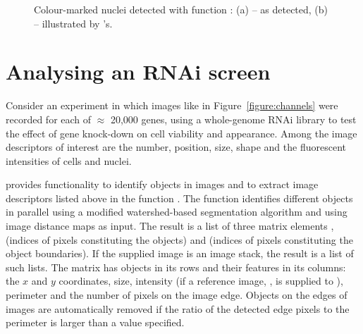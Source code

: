 \begin{figure}
\vspace*{.1in}
\begin{center}
\end{center}
\caption{\label{figure:drawables}
    Colour-marked nuclei detected with function : (a) -- as detected, (b) -- illustrated by 's.
}
\end{figure}

\section*{Analysing an RNAi screen}

Consider an experiment in which images like in Figure~\ref{figure:channels} were recorded for each of $\approx$ 20,000 genes, using a whole-genome RNAi library to test the effect of gene knock-down on cell viability and appearance. Among the image descriptors of interest are the number, position, size, shape and the fluorescent intensities of cells and nuclei. 

 provides functionality to identify objects in images and to extract image descriptors listed above in the function . The function identifies different objects in parallel using a modified watershed-based segmentation algorithm and using image distance maps as input. The result is a list of three matrix elements ,  (indices of pixels constituting the objects) and  (indices of pixels constituting the object boundaries). If the supplied image is an image stack, the result is a list of such lists. The matrix  has objects in its rows and their features in its columns: the $x$ and $y$ coordinates, size, intensity (if a reference image, , is supplied to ), perimeter and the number of pixels on the image edge. Objects on the edges of images are automatically removed if the ratio of the detected edge pixels to the perimeter is larger than a value specified.

